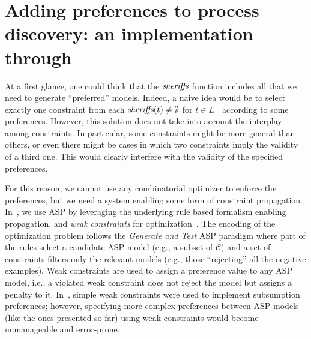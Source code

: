 
\section{Adding preferences to process discovery: an implementation through \asprin}
\label{sec:tool}

At a first glance, one could think that the ${\textit{sheriffs}}$ function includes all that we need to generate ``preferred'' models. Indeed, a naive idea would be to select exactly one constraint from each ${\textit{sheriffs}}(t)\neq\emptyset$ for $t\in L^-$ according to some preferences. However, this solution does not take into account the interplay among constraints. In particular, some constraints might be more general than others, or even there might be cases in which two constraints imply the validity of a third one. 
This would clearly interfere with the validity of the specified preferences.  

For this reason, we cannot use any combinatorial optimizer to enforce the preferences, but we need a system enabling some form of constraint propagation. In~\cite{deviant-tkde}, we use \ac{ASP} by leveraging the underlying rule based formalism enabling propagation, and \emph{weak constraints} for optimization~\cite{asp-intro,clingo}. The encoding of the optimization problem follows the \emph{Generate and Test} \ac{ASP} paradigm where part of the rules select a candidate \ac{ASP} model (e.g., a subset of $\mathcal{C}$) and a set of constraints filters only the relevant models (e.g., those ``rejecting'' all the negative examples). Weak constraints are used to assign a preference value to any \ac{ASP} model, i.e., a violated weak constraint does not reject the model but assigns a penalty to it.
%
In~\cite{deviant-tkde}, simple weak constraints were used to implement subsumption preferences; however, specifying more complex preferences between \ac{ASP} models (like the ones presented so far) using weak constraints would become unmanageable and error-prone. 

